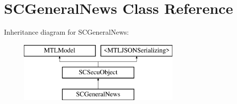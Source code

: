\hypertarget{interface_s_c_general_news}{}\section{S\+C\+General\+News Class Reference}
\label{interface_s_c_general_news}
Inheritance diagram for S\+C\+General\+News\+:\begin{figure}[H]
\begin{center}
\leavevmode
\includegraphics[height=3.000000cm]{interface_s_c_general_news}
\end{center}
\end{figure}
